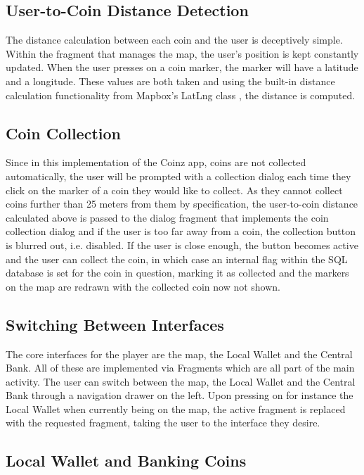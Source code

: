 \documentclass[11pt,a4paper,notitlepage]{article}
\begin{document}
\subsection{User-to-Coin Distance Detection}

    The distance calculation between each coin and the user is deceptively simple. Within the fragment that manages the map, the user's position is kept constantly updated. When the user presses on a coin marker, the marker will have a latitude and a longitude. These values are both taken and using the built-in distance calculation functionality from Mapbox's LatLng class \cite{lat-lng}, the distance is computed.

\subsection{Coin Collection}

    Since in this implementation of the Coinz app, coins are not collected automatically, the user will be prompted with a collection dialog each time they click on the marker of a coin they would like to collect. As they cannot collect coins further than 25 meters from them by specification, the user-to-coin distance calculated above is passed to the dialog fragment that implements the coin collection dialog and if the user is too far away from a coin, the collection button is blurred out, i.e. disabled. If the user is close enough, the button becomes active and the user can collect the coin, in which case an internal flag within the SQL database is set for the coin in question, marking it as collected and the markers on the map are redrawn with the collected coin now not shown.

\subsection{Switching Between Interfaces}

    The core interfaces for the player are the map, the Local Wallet and the Central Bank. All of these are implemented via Fragments \cite{fragments} which are all part of the main activity. The user can switch between the map, the Local Wallet and the Central Bank through a navigation drawer on the left. Upon pressing on for instance the Local Wallet when currently being on the map, the active fragment is replaced with the requested fragment, taking the user to the interface they desire.

\subsection{Local Wallet and Banking Coins}
\end{document}
